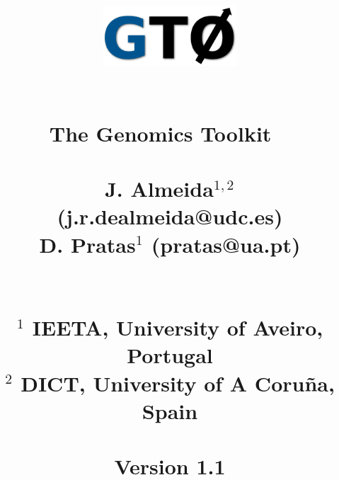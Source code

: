 \documentclass[11pt,journal,compsoc]{report}[1]
\begin{document}
\title{
%
\begin{figure}[h!]
\centerline{\includegraphics[width=5cm]{../imgs/logo.pdf}}
\label{logo}
\end{figure}
~\\
\textbf{The Genomics Toolkit}
~\\~\\
\large
J. Almeida$^{1,2}$ (j.r.dealmeida@udc.es)\\
D. Pratas$^{1}$ (pratas@ua.pt)\\
~\\~\\
\small
$^1$ IEETA, University of Aveiro, Portugal\\
$^2$ DICT, University of A Coru\~na, Spain\\
~\\
Version 1.1
}
\date{}
\maketitle

\tableofcontents

\def \AminoAcidSequenceToolsPath {sections/Amino_acid_sequence_tools}
\def \FASTQToolsPath {sections/FASTQ_tools}
\def \FASTAToolsPath {sections/FASTA_tools}
\def \GenomicSequenceToolsPath {sections/Genomic_sequence_tools}
\def \GeneralPurposeToolsPath {sections/General_purpose_tools}












\end{document}
